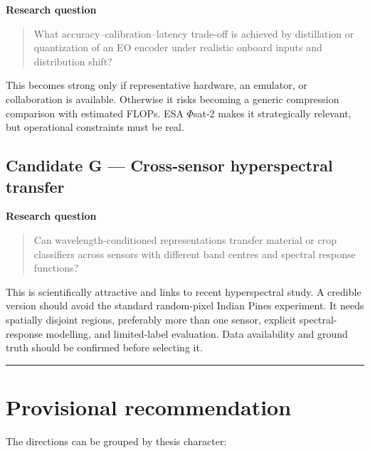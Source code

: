 \documentclass[
  a4paper,
  11pt]{article}
\begin{document}
\textbf{Research question}

\begin{quote}
What accuracy--calibration--latency trade-off is achieved by
distillation or quantization of an EO encoder under realistic onboard
inputs and distribution shift?
\end{quote}

This becomes strong only if representative hardware, an emulator, or
collaboration is available. Otherwise it risks becoming a generic
compression comparison with estimated FLOPs. ESA \(\Phi\)sat-2 makes it
strategically relevant, but operational constraints must be real.

\hypertarget{candidate-g-cross-sensor-hyperspectral-transfer}{%
\subsection{Candidate G --- Cross-sensor hyperspectral
transfer}\label{candidate-g-cross-sensor-hyperspectral-transfer}}

\textbf{Research question}

\begin{quote}
Can wavelength-conditioned representations transfer material or crop
classifiers across sensors with different band centres and spectral
response functions?
\end{quote}

This is scientifically attractive and links to recent hyperspectral
study. A credible version should avoid the standard random-pixel Indian
Pines experiment. It needs spatially disjoint regions, preferably more
than one sensor, explicit spectral-response modelling, and limited-label
evaluation. Data availability and ground truth should be confirmed
before selecting it.

\begin{center}\rule{0.5\linewidth}{0.5pt}\end{center}

\hypertarget{provisional-recommendation}{%
\section{Provisional recommendation}\label{provisional-recommendation}}

The directions can be grouped by thesis character:
\end{document}
